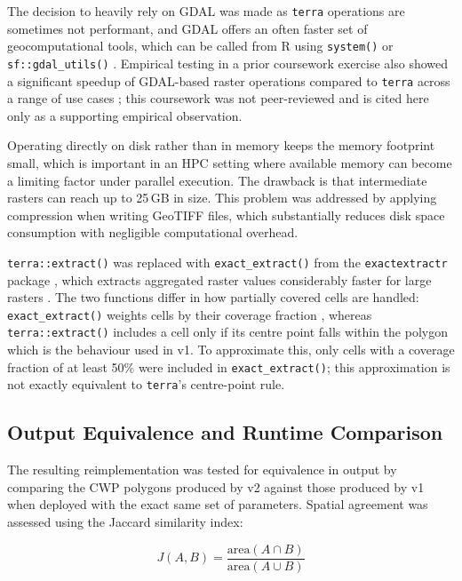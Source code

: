 The decision to heavily rely on GDAL was made as \texttt{terra} operations are 
sometimes not performant, and GDAL offers an often faster set of geocomputational 
tools, which can be called from R using \texttt{system()} or 
\texttt{sf::gdal\_utils()} \citep{lovelace2019geocomputation}. Empirical testing 
in a prior coursework exercise also showed a significant speedup of GDAL-based 
raster operations compared to \texttt{terra} across a range of use cases 
\citep{duerr_raster_deepdive}; this coursework was not peer-reviewed and is cited 
here only as a supporting empirical observation.

Operating directly on disk rather than in memory keeps the memory footprint 
small, which is important in an HPC setting where available memory can become a 
limiting factor under parallel execution. The drawback is that intermediate 
rasters can reach up to 25\,GB in size. This problem was addressed by applying 
compression when writing GeoTIFF files, which substantially reduces disk space consumption 
with negligible computational overhead.

\texttt{terra::extract()} was replaced with \texttt{exact\_extract()} from the 
\texttt{exactextractr} package \citep{exactextractr}, 
which extracts aggregated raster values considerably faster for large rasters 
\citep{mieno_rgis_2022}. The two functions differ in how partially covered cells 
are handled: \texttt{exact\_extract()} weights cells by their coverage fraction 
\citep{isciences_exactextract}, whereas \texttt{terra::extract()} includes a 
cell only if its centre point falls within the polygon 
\citep{hijmans_terra_extract} which is the behaviour used in v1. To approximate this, 
only cells with a coverage fraction of at least 50\% were included in 
\texttt{exact\_extract()}; this approximation is not exactly equivalent to 
\texttt{terra}'s centre-point rule.

\subsection{Output Equivalence and Runtime Comparison}
\label{sec:output_equivalence}

The resulting reimplementation was tested for equivalence in output by comparing 
the CWP polygons produced by v2 against those produced by v1 when deployed with 
the exact same set of parameters. Spatial agreement was assessed using the 
Jaccard similarity index:

\begin{equation}
	J(A, B) = \frac{\text{area}(A \cap B)}{\text{area}(A \cup B)}
	\label{eq:jaccard}
\end{equation}

